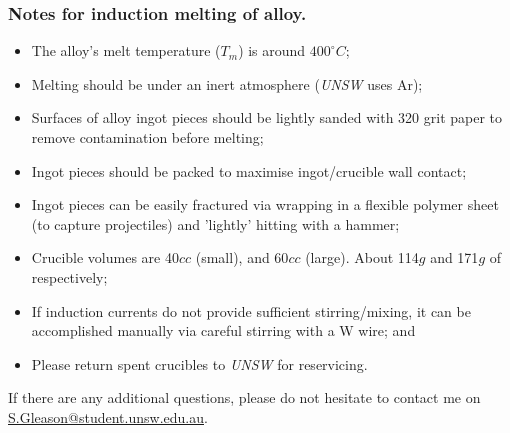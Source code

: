 \subsubsection{Notes for induction melting of \MgZnCa alloy.}
\begin{itemize}
\item The \MgZnCa alloy's melt temperature ($T_{m}$) is around $400^{\circ}C$;
\item Melting should be under an inert atmosphere (\textit{UNSW} uses Ar);
\item Surfaces of alloy ingot pieces should be lightly sanded with 320 grit paper to remove contamination before melting;
\item Ingot pieces should be packed to maximise ingot/crucible wall contact;
\item Ingot pieces can be easily fractured via wrapping in a flexible polymer sheet (to capture projectiles) and 'lightly' hitting with a hammer;
\item Crucible volumes are 40$cc$ (small), and 60$cc$ (large). About 114$g$ and 171$g$ of \MgZnCa respectively;
\item If induction currents do not provide sufficient stirring/mixing, it can be accomplished manually via careful stirring with a W wire; and
\item Please return spent crucibles to \textit{UNSW} for reservicing. 
\end{itemize}

If there are any additional questions, please do not hesitate to contact me on \href{"mailto:s.gleason@student.unsw.edu.au"}{S.Gleason@student.unsw.edu.au}. 
